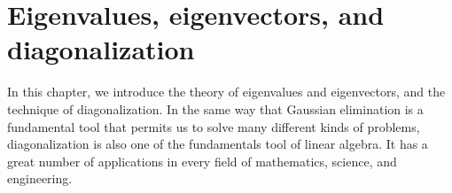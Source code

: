 \chapter{Eigenvalues, eigenvectors, and diagonalization}

In this chapter, we introduce the theory of eigenvalues and
eigenvectors, and the technique of diagonalization. In the same way
that Gaussian elimination is a fundamental tool that permits us to
solve many different kinds of problems, diagonalization is also one of
the fundamentals tool of linear algebra. It has a great number of
applications in every field of mathematics, science, and engineering.
